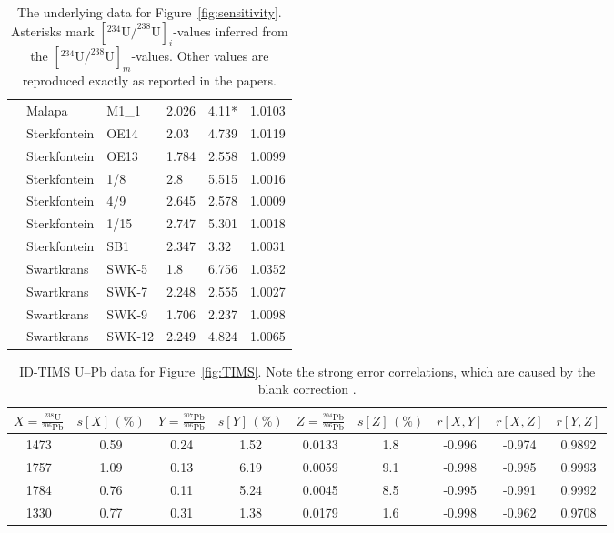 \documentclass[11pt]{article}
\begin{document}
\begin{table}[!ht]
\begin{tabular}{llllll}
    \citet{pickering2019} & Malapa & M1\_1 & 2.026 & 4.11* & 1.0103 \\
    \citet{pickering2019} & Sterkfontein & OE14 & 2.03 & 4.739 & 1.0119 \\
    \citet{pickering2019} & Sterkfontein & OE13 & 1.784 & 2.558 & 1.0099 \\
    \citet{pickering2019} & Sterkfontein & 1/8 & 2.8 & 5.515 & 1.0016 \\
    \citet{pickering2019} & Sterkfontein & 4/9 & 2.645 & 2.578 & 1.0009 \\
    \citet{pickering2019} & Sterkfontein & 1/15 & 2.747 & 5.301 & 1.0018 \\
    \citet{pickering2019} & Sterkfontein & SB1 & 2.347 & 3.32 & 1.0031 \\
    \citet{pickering2019} & Swartkrans & SWK-5 & 1.8 & 6.756 & 1.0352 \\
    \citet{pickering2019} & Swartkrans & SWK-7 & 2.248 & 2.555 & 1.0027 \\
    \citet{pickering2019} & Swartkrans & SWK-9 & 1.706 & 2.237 & 1.0098 \\
    \citet{pickering2019} & Swartkrans & SWK-12 & 2.249 & 4.824 & 1.0065 \\
    \hline
  \end{tabular}
  \caption{The underlying data for
    Figure~\ref{fig:sensitivity}. Asterisks mark
    $\left[^{234}\mbox{U}{/}^{238}\mbox{U}\right]_i$-values inferred
    from the
    $\left[^{234}\mbox{U}{/}^{238}\mbox{U}\right]_m$-values. Other
    values are reproduced exactly as reported in the papers.}
  \label{tab:sensitivity}
\end{table}

\begin{table}[!ht]
\centering
\begin{tabular}{ccccccccc}
  \hline
    $X=\frac{^{238}\mbox{U}}{^{206}\mbox{Pb}}$ &
    $s[X]\,(\%)$ &
    $Y=\frac{^{207}\mbox{Pb}}{^{206}\mbox{Pb}}$ &
    $s[Y]\,(\%)$ & 
    $Z=\frac{^{204}\mbox{Pb}}{^{206}\mbox{Pb}}$ &
    $s[Z]\,(\%)$ &
    $r[X,Y]$ & $r[X,Z]$ & $r[Y,Z]$ \\ \hline
  1473 & 0.59 & 0.24 & 1.52 & 0.0133 & 1.8 & -0.996 & -0.974 & 0.9892 \\ 
  1757 & 1.09 & 0.13 & 6.19 & 0.0059 & 9.1 & -0.998 & -0.995 & 0.9993 \\ 
  1784 & 0.76 & 0.11 & 5.24 & 0.0045 & 8.5 & -0.995 & -0.991 & 0.9992 \\ 
  1330 & 0.77 & 0.31 & 1.38 & 0.0179 & 1.6 & -0.998 & -0.962 & 0.9708 \\
  \hline
\end{tabular}
\caption{ID-TIMS U--Pb data for Figure~\ref{fig:TIMS}. Note the strong
  error correlations, which are caused by the blank correction
  \citep{schmitz2007}.}
\label{tab:TIMS}
\end{table}
\end{document}

